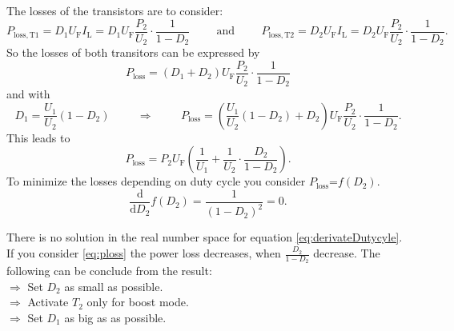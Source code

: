 \begin{solutionblock}
    The losses of the transistors are to consider:
    \begin{equation}
        P_\mathrm{loss,T1}=D_1 U_\mathrm{F} I_\mathrm{L}=D_1 U_\mathrm{F} \frac{P_\mathrm{2}}{U_\mathrm{2}} \cdot \frac{1}{1-D_2}
        \hspace{1cm} \mathrm{and} \hspace{1cm}
        P_\mathrm{loss,T2}=D_2 U_\mathrm{F} I_\mathrm{L}=D_2 U_\mathrm{F} \frac{P_\mathrm{2}}{U_\mathrm{2}} \cdot \frac{1}{1-D_2}.
    \end{equation}
    So the losses of both transitors can be expressed by
    \begin{equation}
        P_\mathrm{loss}=\left(D_1 +D_2\right) U_\mathrm{F} \frac{P_\mathrm{2}}{U_\mathrm{2}} \cdot \frac{1}{1-D_2}
    \end{equation}
    and with
    \begin{equation}
        D_1 =\frac{U_\mathrm{1}}{U_\mathrm{2}} \left(1 - D_2 \right) 
        \hspace{1cm} \Rightarrow \hspace{1cm}
        P_\mathrm{loss}=\left(\frac{U_\mathrm{1}}{U_\mathrm{2}} \left(1 - D_2 \right)+D_2\right) U_\mathrm{F} \frac{P_\mathrm{2}}{U_\mathrm{2}} \cdot \frac{1}{1-D_2}.
    \end{equation}
    This leads to
    \begin{equation}
        P_\mathrm{loss}=P_\mathrm{2} U_\mathrm{F} \left(\frac{1}{U_\mathrm{1}} + 
        \frac{1}{U_\mathrm{2}} \cdot \frac{D_2}{1-D_2}\right).
        \label{eq:ploss}
    \end{equation}
    To minimize the losses depending on duty cycle you consider $P_\mathrm{loss}$=$f(D_2)$.
    \begin{equation}
        \frac{\mathrm{d}}{\mathrm{d}D_2} f(D_2)= \frac{1}{\left(1 - D_2 \right)^2}=0.
        \label{eq:derivateDutycyle}
    \end{equation}

    There is no solution in the real number space for equation \eqref{eq:derivateDutycyle}.
    If you consider \eqref{eq:ploss} the power loss decreases, when $\frac{D_2}{1-D_2}$ decrease.
    The following can be conclude from the result: \\
    $\Rightarrow$ Set $D_2$ as small as possible.\\
    $\Rightarrow$ Activate $T_2$ only for boost mode.\\
    $\Rightarrow$ Set $D_1$ as big as as possible.\\
\end{solutionblock}

